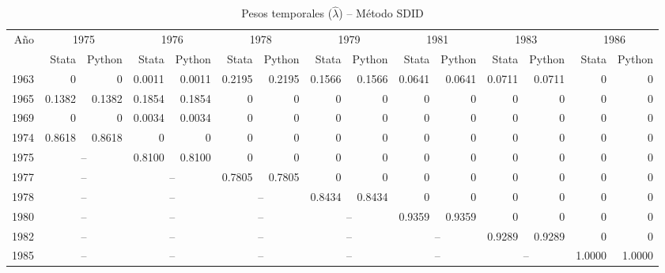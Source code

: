 \begin{table}[H]
\centering
\caption{Pesos temporales ($\hat{\lambda}$) -- M\'etodo SDID}
\label{tab:lambda_sdid}
\footnotesize
\begin{tabular}{rrrrrrrrrrrrrrr}
\toprule
A\~no & \multicolumn{2}{c}{1975} & \multicolumn{2}{c}{1976} & \multicolumn{2}{c}{1978} & \multicolumn{2}{c}{1979} & \multicolumn{2}{c}{1981} & \multicolumn{2}{c}{1983} & \multicolumn{2}{c}{1986} \\
 & \scriptsize Stata & \scriptsize Python & \scriptsize Stata & \scriptsize Python & \scriptsize Stata & \scriptsize Python & \scriptsize Stata & \scriptsize Python & \scriptsize Stata & \scriptsize Python & \scriptsize Stata & \scriptsize Python & \scriptsize Stata & \scriptsize Python \\
\midrule
1963 & 0 & 0 & 0.0011 & 0.0011 & 0.2195 & 0.2195 & 0.1566 & 0.1566 & 0.0641 & 0.0641 & 0.0711 & 0.0711 & 0 & 0 \\
1965 & 0.1382 & 0.1382 & 0.1854 & 0.1854 & 0 & 0 & 0 & 0 & 0 & 0 & 0 & 0 & 0 & 0 \\
1969 & 0 & 0 & 0.0034 & 0.0034 & 0 & 0 & 0 & 0 & 0 & 0 & 0 & 0 & 0 & 0 \\
1974 & 0.8618 & 0.8618 & 0 & 0 & 0 & 0 & 0 & 0 & 0 & 0 & 0 & 0 & 0 & 0 \\
1975 & \multicolumn{2}{c}{--} & 0.8100 & 0.8100 & 0 & 0 & 0 & 0 & 0 & 0 & 0 & 0 & 0 & 0 \\
1977 & \multicolumn{2}{c}{--} & \multicolumn{2}{c}{--} & 0.7805 & 0.7805 & 0 & 0 & 0 & 0 & 0 & 0 & 0 & 0 \\
1978 & \multicolumn{2}{c}{--} & \multicolumn{2}{c}{--} & \multicolumn{2}{c}{--} & 0.8434 & 0.8434 & 0 & 0 & 0 & 0 & 0 & 0 \\
1980 & \multicolumn{2}{c}{--} & \multicolumn{2}{c}{--} & \multicolumn{2}{c}{--} & \multicolumn{2}{c}{--} & 0.9359 & 0.9359 & 0 & 0 & 0 & 0 \\
1982 & \multicolumn{2}{c}{--} & \multicolumn{2}{c}{--} & \multicolumn{2}{c}{--} & \multicolumn{2}{c}{--} & \multicolumn{2}{c}{--} & 0.9289 & 0.9289 & 0 & 0 \\
1985 & \multicolumn{2}{c}{--} & \multicolumn{2}{c}{--} & \multicolumn{2}{c}{--} & \multicolumn{2}{c}{--} & \multicolumn{2}{c}{--} & \multicolumn{2}{c}{--} & 1.0000 & 1.0000 \\
\bottomrule
\end{tabular}
\end{table}


